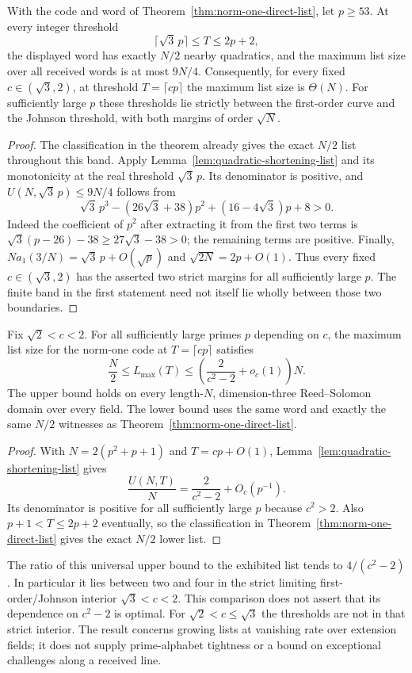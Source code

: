 \begin{corollary}\label{cor:norm-one-full-interior-band}
With the code and word of Theorem~\ref{thm:norm-one-direct-list}, let
$p\ge53$. At every integer threshold
\[
 \lceil\sqrt3\,p\rceil\le T\le2p+2,
\]
the displayed word has exactly $N/2$ nearby quadratics, and the maximum
list size over all received words is at most $9N/4$.
Consequently, for every fixed $c\in(\sqrt3,2)$, at threshold
$T=\lceil cp\rceil$ the maximum list size is $\Theta(N)$.
For sufficiently large $p$ these thresholds lie strictly between the
first-order curve and the Johnson threshold, with both margins of
order $\sqrt N$.
\end{corollary}

\begin{proof}
The classification in the theorem already gives the exact $N/2$ list
throughout this band. Apply Lemma~\ref{lem:quadratic-shortening-list}
and its monotonicity at the real threshold $\sqrt3\,p$.
Its denominator is positive, and $U(N,\sqrt3\,p)\le9N/4$ follows from
\[
 \sqrt3\,p^3-(26\sqrt3+38)p^2+(16-4\sqrt3)p+8>0.
\]
Indeed the coefficient of $p^2$ after extracting it from the first
two terms is $\sqrt3(p-26)-38\ge27\sqrt3-38>0$;
the remaining terms are positive.
Finally, $Na_1(3/N)=\sqrt3\,p+O(\sqrt p)$ and
$\sqrt{2N}=2p+O(1)$. Thus every fixed $c\in(\sqrt3,2)$
has the asserted two strict margins for all sufficiently large $p$.
The finite band in the first statement need not itself lie wholly
between those two boundaries.
\end{proof}


\begin{corollary}\label{cor:norm-one-general-range}
Fix $\sqrt2<c<2$. For all sufficiently large primes $p$ depending on
$c$, the maximum list size for the norm-one code at
$T=\lceil cp\rceil$ satisfies
\[
 \frac N2\le L_{\max}(T)
 \le\left(\frac{2}{c^2-2}+o_c(1)\right)N.
\]
The upper bound holds on every length-$N$, dimension-three
Reed--Solomon domain over every field. The lower bound uses the same
word and exactly the same $N/2$ witnesses as
Theorem~\ref{thm:norm-one-direct-list}.
\end{corollary}

\begin{proof}
With $N=2(p^2+p+1)$ and $T=cp+O(1)$,
Lemma~\ref{lem:quadratic-shortening-list} gives
\[
 \frac{U(N,T)}N=\frac{2}{c^2-2}+O_c(p^{-1}).
\]
Its denominator is positive for all sufficiently large $p$ because
$c^2>2$. Also $p+1<T\le2p+2$ eventually, so the classification
in Theorem~\ref{thm:norm-one-direct-list} gives the exact $N/2$ lower list.
\end{proof}

The ratio of this universal upper bound to the exhibited list tends
to $4/(c^2-2)$. In particular it lies between two and four in the
strict limiting first-order/Johnson interior $\sqrt3<c<2$.
This comparison does not assert that its dependence on $c^2-2$ is
optimal. For $\sqrt2<c\le\sqrt3$ the thresholds are not in that strict
interior. The result concerns growing lists at vanishing rate over
extension fields; it does not supply prime-alphabet tightness or a
bound on exceptional challenges along a received line.
